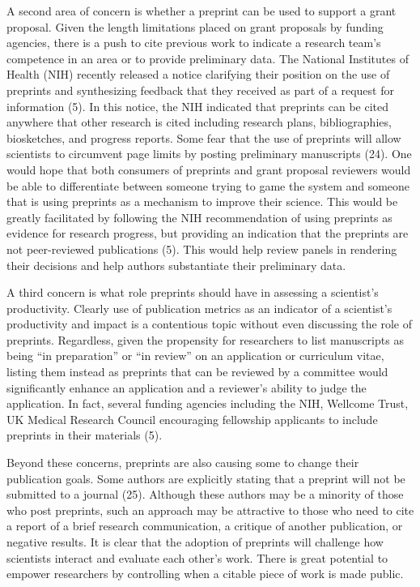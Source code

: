\documentclass[11pt,]{article}
\begin{document}
A second area of concern is whether a preprint can be used to support a
grant proposal. Given the length limitations placed on grant proposals
by funding agencies, there is a push to cite previous work to indicate a
research team's competence in an area or to provide preliminary data.
The National Institutes of Health (NIH) recently released a notice
clarifying their position on the use of preprints and synthesizing
feedback that they received as part of a request for information (5). In
this notice, the NIH indicated that preprints can be cited anywhere that
other research is cited including research plans, bibliographies,
biosketches, and progress reports. Some fear that the use of preprints
will allow scientists to circumvent page limits by posting preliminary
manuscripts (24). One would hope that both consumers of preprints and
grant proposal reviewers would be able to differentiate between someone
trying to game the system and someone that is using preprints as a
mechanism to improve their science. This would be greatly facilitated by
following the NIH recommendation of using preprints as evidence for
research progress, but providing an indication that the preprints are
not peer-reviewed publications (5). This would help review panels in
rendering their decisions and help authors substantiate their
preliminary data.

A third concern is what role preprints should have in assessing a
scientist's productivity. Clearly use of publication metrics as an
indicator of a scientist's productivity and impact is a contentious
topic without even discussing the role of preprints. Regardless, given
the propensity for researchers to list manuscripts as being ``in
preparation'' or ``in review'' on an application or curriculum vitae,
listing them instead as preprints that can be reviewed by a committee
would significantly enhance an application and a reviewer's ability to
judge the application. In fact, several funding agencies including the
NIH, Wellcome Trust, UK Medical Research Council encouraging fellowship
applicants to include preprints in their materials (5).

Beyond these concerns, preprints are also causing some to change their
publication goals. Some authors are explicitly stating that a preprint
will not be submitted to a journal (25). Although these authors may be a
minority of those who post preprints, such an approach may be attractive
to those who need to cite a report of a brief research communication, a
critique of another publication, or negative results. It is clear that
the adoption of preprints will challenge how scientists interact and
evaluate each other's work. There is great potential to empower
researchers by controlling when a citable piece of work is made public.
\end{document}
